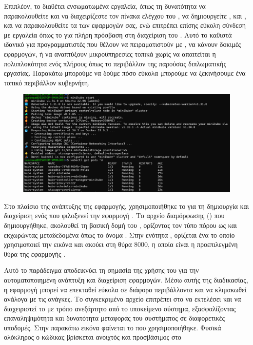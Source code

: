 Επιπλέον, το  
διαθέτει ενσωματωμένα εργαλεία, όπως τη δυνατότητα να παρακολουθείτε
και να διαχειρίζεστε τον πίνακα ελέγχου του , 
να δημιουργείτε , και , και 
να παρακολουθείτε τα  των εφαρμογών σας, ενώ επιτρέπει 
επίσης εύκολη σύνδεση με εργαλεία όπως το  
για πλήρη πρόσβαση στη διαχείριση του . 
Αυτό το καθιστά ιδανικό για προγραμματιστές που θέλουν να 
πειραματιστούν με , 
να κάνουν δοκιμές εφαρμογών, ή να αναπτύξουν μικροϋπηρεσίες 
τοπικά χωρίς να απαιτείται η πολυπλοκότητα ενός πλήρους 
όπως το περιβάλλον της παρούσας διπλωματικής εργασίας. Παρακάτω μπορούμε να δούμε 
πόσο εύκολα μπορούμε να ξεκινήσουμε ένα τοπικό περιβάλλον κυβερνήτη.


\begin{figure}[h]
	\centering
	\includegraphics[width=1.5\textwidth]{graphics/minikube_deployment_k8s.png}
	\caption{}
\end{figure}


Στο πλαίσιο της ανάπτυξης της εφαρμογής, χρησιμοποιήθηκε το 
 για τη δημιουργία και διαχείριση ενός  
που φιλοξενεί την εφαρμογή . Το αρχείο διαμόρφωσης 
() που δημιουργήθηκε, ακολουθεί τη βασική δομή του , 
ορίζοντας τον τύπο πόρου ως  και 
εκχωρώντας μεταδεδομένα όπως το όνομα . 
Στην ενότητα , ορίζεται ένα  
το οποίο χρησιμοποιεί την εικόνα  
και ακούει στη θύρα 8000, η οποία είναι η προεπιλεγμένη θύρα της 
εφαρμογής .

Αυτό το παράδειγμα αποδεικνύει τη σημασία της χρήσης του  
για την αυτοματοποιημένη ανάπτυξη και διαχείριση  
εφαρμογών. Μέσω αυτής της διαδικασίας, η εφαρμογή μπορεί να 
επεκταθεί εύκολα σε διάφορα περιβάλλοντα και να κλιμακωθεί 
ανάλογα με τις ανάγκες. Το συγκεκριμένο αρχείο  
επιτρέπει στο  να εκτελέσει και να διαχειριστεί το 
 με τρόπο ανεξάρτητο από το υποκείμενο σύστημα, 
εξασφαλίζοντας επαναληψιμότητα και δυνατότητα μεταφοράς του 
συστήματος σε διαφορετικές υποδομές. Στην παρακάτω εικόνα φαίνεται το 
 που χρησιμοποιήθηκε. Φυσικά ολόκληρος ο κώδικας βρίσκεται
ανοιχτός και προσβάσιμος στο 


